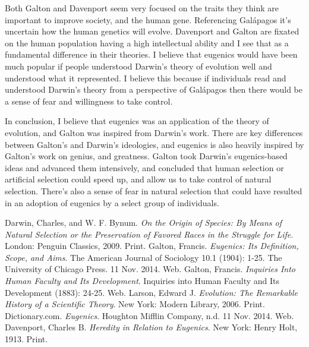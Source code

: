 \documentclass[11pt, oneside]{article}
\begin{document}
\par Both Galton and Davenport seem very focused on the traits they think are important to improve society, and the human gene. Referencing Gal\'apagos it's uncertain how the human genetics will evolve. Davenport and Galton are fixated on the human population having a high intellectual ability and I see that as a fundamental difference in their theories. I believe that eugenics would have been much popular if people understood Darwin's theory of evolution well and understood what it represented. I believe this because if individuals read and understood Darwin's theory from a perspective of Gal\'apagos then there would be a sense of fear and willingness to take control. 

\par In conclusion, I believe that eugenics was an application of the theory of evolution, and Galton was inspired from Darwin's work. There are key differences between Galton's and Darwin's ideologies, and eugenics is also heavily inspired by Galton's work on genius, and greatness. Galton took Darwin's eugenics-based ideas and advanced them intensively, and concluded that human selection or artificial selection could speed up, and allow us to take control of natural selection. There's also a sense of fear in natural selection that could have resulted in an adoption of eugenics by a select group of individuals. 

\begin{thebibliography}{9}
  Darwin, Charles, and W. F. Bynum.
  \emph{On the Origin of Species: By Means of Natural Selection or the Preservation of Favored Races in the Struggle for Life}.
  London: Penguin Classics, 2009.
  Print.
  Galton, Francis.
  \emph{Eugenics: Its Definition, Scope, and Aims}.
  The American Journal of Sociology 10.1 (1904): 1-25.
  The University of Chicago Press. 11 Nov. 2014.
  Web.
  Galton, Francis.
  \emph{Inquiries Into Human Faculty and Its Development}.
  Inquiries into Human Faculty and Its Development (1883): 24-25. 
  Web.
  Larson, Edward J.
  \emph{Evolution: The Remarkable History of a Scientific Theory}.
  New York: Modern Library, 2006. 
  Print.
  Dictionary.com.
  \emph{Eugenics}.
  Houghton Mifflin Company, n.d. 11 Nov. 2014.  
  Web.
  Davenport, Charles B.
  \emph{Heredity in Relation to Eugenics}.
  New York: Henry Holt, 1913.  
  Print.
\end{thebibliography}
\end{document}
